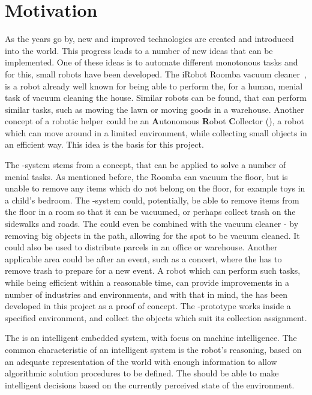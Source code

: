 \section{Motivation} \label{sec:motivation}

As the years go by, new and improved technologies are created and introduced into the world. This progress leads to a number of new ideas that can be implemented. One of these ideas is to automate different monotonous tasks and for this, small robots have been developed. The iRobot Roomba vacuum cleaner~\citep{roomba}, is a robot already well known for being able to perform the, for a human, menial task of vacuum cleaning the house. Similar robots can be found, that can perform similar tasks, such as mowing the lawn or moving goods in a warehouse. Another concept of a robotic helper could be an \textbf{A}utonomous \textbf{R}obot \textbf{C}ollector (\projname{}), a robot which can move around in a limited environment, while collecting small objects in an efficient way. This idea is the basis for this project.

The \projname{}-system stems from a concept, that can be applied to solve a number of menial tasks. As mentioned before, the Roomba can vacuum the floor, but is unable to remove any items which do not belong on the floor, for example toys in a child's bedroom. The \projname{}-system could, potentially, be able to remove items from the floor in a room so that it can be vacuumed, or perhaps collect trash on the sidewalks and roads. The \projname{} could even be combined with the vacuum cleaner - by removing big objects in the path, allowing for the spot to be vacuum cleaned. It could also be used to distribute parcels in an office or warehouse. Another applicable area could be after an event, such as a concert, where the \projname{} has to remove trash to prepare for a new event. A robot which can perform such tasks, while being efficient within a reasonable time, can provide improvements in a number of industries and environments, and with that in mind, the \projname{} has been developed in this project as a proof of concept. The \projname{}-prototype works inside a specified environment, and collect the objects which suit its collection assignment. 

The \projname{} is an intelligent embedded system, with focus on machine intelligence. The common characteristic of an intelligent system is the robot's reasoning, based on an adequate representation of the world with enough information to allow algorithmic solution procedures to be defined. The \projname{} should be able to make intelligent decisions based on the currently perceived state of the environment.

